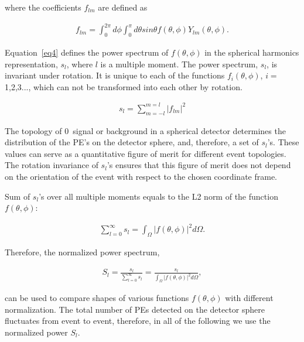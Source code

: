 where the coefficients $f_{lm}$ are defined as
 
\begin{eqnarray}
\label{eq3}
f_{lm} = \int_{0}^{2\pi} d\phi \int_0^{\pi} d\theta sin\theta f(\theta,\phi) Y_{lm}(\theta,\phi).
\end{eqnarray}

Equation~\ref{eq4} defines the power spectrum of $f(\theta,\phi)$ in the spherical harmonics representation, $s_l$, where $l$ is a multiple moment. The power spectrum, $s_l$, is invariant under rotation. It is unique to each of the functions $f_i(\theta,\phi)$, $i=$1,2,3..., which can not be transformed into each other by rotation.

\begin{eqnarray}
\label{eq4}
s_l = \sum_{m=-l}^{m=l} |f_{lm}|^2
\end{eqnarray}


The topology of 0\nbb~signal or background in a spherical detector determines the distribution of the PE's on the detector sphere, and, therefore, a set of $s_l$'s. These values can serve as a quantitative figure of merit for different event topologies. The rotation invariance of $s_l$'s ensures that this figure of merit does not depend on the orientation of the event with respect to the chosen coordinate frame.

Sum of $s_l$'s over all multiple moments equals to the L2 norm of the function $f(\theta,\phi)$:

\begin{eqnarray}
\label{eq5}
\sum_{l=0}^{\infty} s_l = \int_{\Omega} |f(\theta,\phi)|^2 d\Omega.
\end{eqnarray}

Therefore, the normalized power spectrum,

\begin{eqnarray}
\label{eq6}
S_l = \frac{s_l}{\sum_{l=0}^{\infty} s_l} =  \frac{s_l}{\int_{\Omega} |f(\theta,\phi)|^2 d\Omega},
\end{eqnarray}

can be used to compare shapes of various functions $f(\theta,\phi)$ with different normalization. The total number of PEs detected on the detector sphere fluctuates from event to event, therefore, in all of the following we use the normalized power $S_l$.

